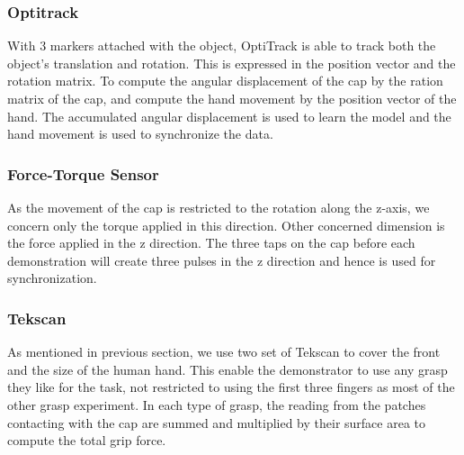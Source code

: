 \subsubsection{Optitrack}
\label{sec:optiktrack}
With 3 markers attached with the object, OptiTrack is able to track both the object's translation and rotation. This is expressed in the position vector and the rotation matrix. To compute the angular displacement of the cap by the ration matrix of the cap, and compute the hand movement by the position vector of the hand. The accumulated angular displacement is used to learn the model and the hand movement is used to synchronize the data. %
%

\subsubsection{Force-Torque Sensor}
\label{ftsensor}
As the movement of the cap is restricted to the rotation along the z-axis, we concern only the torque applied in this direction.  %
Other concerned dimension is the force applied in the z direction. The three taps on the cap before each demonstration will create three pulses in the z direction and hence is used for synchronization.



\subsubsection{Tekscan}
\label{tekscan}
As mentioned in previous section, we use two set of Tekscan to cover the front and the size of the human hand. This enable the demonstrator to use any grasp they like for the task, not restricted to using the first three fingers as most of the other grasp experiment. In each type of grasp, the reading from the patches contacting with the cap are summed and multiplied by their surface area to compute the total grip force.%

